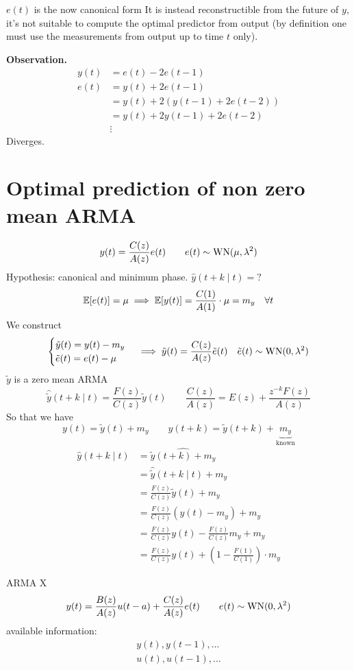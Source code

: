$e(t)$ is the now canonical form 
It is instead reconstructible from the future of $y$, it's not suitable to compute the optimal predictor from output (by definition one must use the measurements from output up to time $t$ only).

\textbf{Observation.}
\begin{align*}
	y(t)&=e(t)-2e(t-1)\\
	e(t)&=y(t)+2e(t-1)\\
	&=y(t)+2(y(t-1)+2e(t-2))\\
	&=y(t)+2y(t-1)+2e(t-2)\\
	&\vdots
\end{align*}
Diverges.


\section{Optimal prediction of non zero mean ARMA}
\[
	y(t)=\frac{C(z)}{A(z)}e(t)\qquad e(t)\sim \operatorname{WN}(\mu,\lambda^2 )
\]
Hypothesis: canonical and minimum phase.
$\hat y(t+k\mid t)=?$
\[
	\mathbb{E}[e(t)]=\mu \implies \mathbb{E}[y(t)]=\frac{C(1)}{A(1)}\cdot\mu=m_{y} \quad \forall t
\]
We construct
\[
	\begin{cases}
		\tilde y(t)=y(t)-m_{y}\\
		\tilde e(t)=e(t)-\mu
	\end{cases}
	\implies 
	\tilde y(t)=\frac{C(z)}{A(z)}\tilde e(t) \quad \tilde e(t)\sim \operatorname{WN}(0,\lambda^2)
\]
$\tilde y$ is a zero mean ARMA
\[
	\hat{\tilde y} (t+k\mid t) = \frac{F(z)}{C(z)}\tilde y(t) \qquad \frac{C(z)}{A(z)}=E(z)+\frac{z^{-k}F(z) }{A(z)}
\]
So that we have
\[
	y(t)=\tilde y(t)+m_{y} \qquad y(t+k)=\tilde y(t+k)+\underbrace{m_{y}}_{\text{known}}
\]
\begin{align*}
	\hat y(t+k\mid t)&=\widehat{\tilde y(t+k)+m_{y}}\\
	&= \hat{\tilde y}(t+k\mid t)+m_{y}\\
	&=\frac{F(z)}{C(z)}\tilde y(t)+m_{y}\\
	&=\frac{F(z)}{C(z)}(y(t)-m_{y})+m_{y}\\
	&=\frac{F(z)}{C(z)}y(t)-\frac{F(z)}{C(z)}m_{y}+m_{y}\\
	&=\frac{F(z)}{C(z)}y(t)+\left( 1-\frac{F(1)}{C(1)} \right)  \cdot m_{y}
\end{align*}

ARMA X
\[
	y(t)=\frac{B(z)}{A(z)} u(t-a)+\frac{C(z)}{A(z)}e(t)\qquad e(t)\sim \operatorname{WN}(0,\lambda^2 )
\]
available information:
\begin{gather*}
	y(t),y(t-1),\ldots \\
	u(t),u(t-1),\ldots
\end{gather*}































